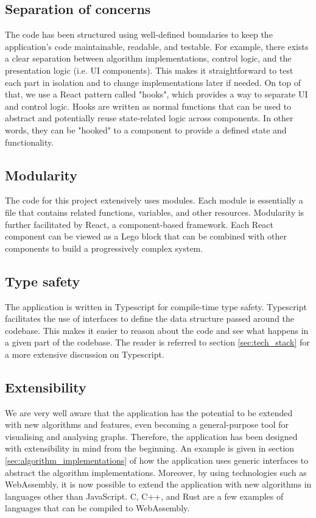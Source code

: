 \documentclass{l4proj}
\begin{document}
\subsection{Separation of concerns}
The code has been structured using well-defined boundaries to keep the application's code maintainable, readable, and testable. For example, there exists a clear separation between algorithm implementations, control logic, and the presentation logic (i.e. UI components). This makes it straightforward to test each part in isolation and to change implementations later if needed. On top of that, we use a React pattern called "hooks", which provides a way to separate UI and control logic. Hooks are written as normal functions that can be used to abstract and potentially reuse state-related logic across components. In other words, they can be "hooked" to a component to provide a defined state and functionality.
\subsection{Modularity}
The code for this project extensively uses modules. Each module is essentially a file that contains related functions, variables, and other resources.
Modularity is further facilitated by React, a component-based framework. Each React component can be viewed as a Lego block that can be combined with other components to build a progressively complex system.
\subsection{Type safety}
The application is written in Typescript for compile-time type safety. Typescript facilitates the use of interfaces to define the data structure passed around the codebase. This makes it easier to reason about the code and see what happens in a given part of the codebase. The reader is referred to section \ref{sec:tech_stack} for a more extensive discussion on Typescript.
\subsection{Extensibility}
We are very well aware that the application has the potential to be extended with new algorithms and features, even becoming a general-purpose tool for visualising and analysing graphs. Therefore, the application has been designed with extensibility in mind from the beginning. An example is given in section \ref{sec:algorithm_implementations} of how the application uses generic interfaces to abstract the algorithm implementations. Moreover, by using technologies such as WebAssembly, it is now possible to extend the application with new algorithms in languages other than JavaScript. C, C++, and Rust are a few examples of languages that can be compiled to WebAssembly.
\end{document}
